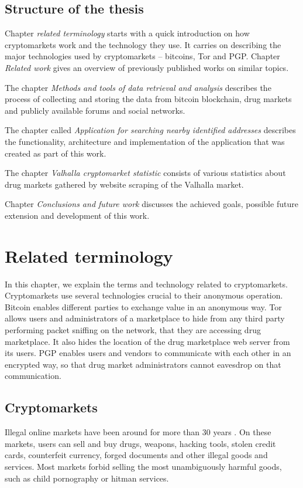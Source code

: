 \documentclass[
  digital, %
  table,   %
  lof,     %
  lot,     %
  oneside
]{fithesis3}
\begin{document}
\section{Structure of the thesis}
Chapter \emph{related terminology} starts with a quick introduction
on how cryptomarkets work and the technology they use.
It carries on describing the major technologies used by cryptomarkets -- bitcoins, Tor and PGP.
Chapter \emph{Related work} gives an overview of previously published works on similar topics. 

The chapter \emph{Methods and tools of data retrieval and analysis} describes the process of collecting
and storing the data from bitcoin blockchain, drug markets and publicly available forums and social networks. 

The chapter called 
\emph{Application for searching nearby identified addresses}
describes the functionality, architecture and implementation of the application that was created as part of this work.

The chapter \emph{Valhalla cryptomarket statistic} consists of various statistics about
drug markets gathered by website scraping of the Valhalla market.

Chapter \emph{Conclusions and future work} discusses the achieved goals, possible future extension and development
of this work.


\chapter{Related terminology}

In this chapter, we explain the terms and technology related to cryptomarkets.
Cryptomarkets use several technologies crucial to their anonymous operation.
Bitcoin enables different parties to exchange value in an anonymous way.
Tor allows users and administrators of a marketplace to hide from any third party performing packet sniffing on the network,
that they are accessing drug marketplace. It also hides the location of the drug marketplace web server from its users.
PGP enables users and vendors to communicate with each other in an encrypted way,
so that drug market administrators cannot eavesdrop on that communication.

\section{Cryptomarkets}

Illegal online markets have been around for more than 30 years \cite{motoyama2011analysis}.
On these markets, users can sell and buy drugs, weapons, hacking tools, stolen credit cards,
counterfeit currency, forged documents and other illegal goods and services.
Most markets forbid selling the most unambiguously harmful goods, such as child pornography or hitman services.
\end{document}
